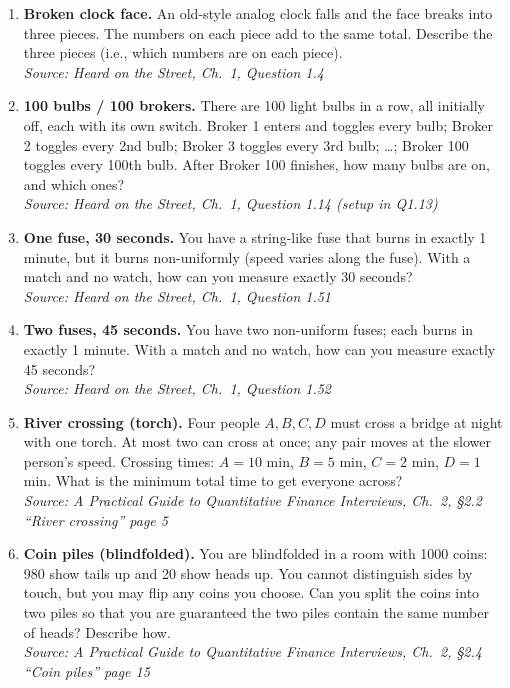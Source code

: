 \documentclass[11pt]{article}
\begin{document}
\begin{enumerate}[label=\textbf{\arabic*.}, resume]

\item \textbf{Broken clock face.} An old-style analog clock falls and the face breaks into three pieces. The numbers on each piece add to the same total. Describe the three pieces (i.e., which numbers are on each piece).\\
\hfill{\small\textit{Source: Heard on the Street, Ch.\ 1, Question 1.4 }}

\item \textbf{100 bulbs / 100 brokers.} There are 100 light bulbs in a row, all initially off, each with its own switch. Broker 1 enters and toggles every bulb; Broker 2 toggles every 2nd bulb; Broker 3 toggles every 3rd bulb; \dots; Broker 100 toggles every 100th bulb. After Broker 100 finishes, how many bulbs are on, and which ones?\\
\hfill{\small\textit{Source: Heard on the Street, Ch.\ 1, Question 1.14 (setup in Q1.13) }}

\item \textbf{One fuse, 30 seconds.} You have a string-like fuse that burns in exactly 1 minute, but it burns non-uniformly (speed varies along the fuse). With a match and no watch, how can you measure exactly 30 seconds?\\
\hfill{\small\textit{Source: Heard on the Street, Ch.\ 1, Question 1.51 }}

\item \textbf{Two fuses, 45 seconds.} You have two non-uniform fuses; each burns in exactly 1 minute. With a match and no watch, how can you measure exactly 45 seconds?\\
\hfill{\small\textit{Source: Heard on the Street, Ch.\ 1, Question 1.52 }}

\item \textbf{River crossing (torch).} Four people $A,B,C,D$ must cross a bridge at night with one torch. At most two can cross at once; any pair moves at the slower person’s speed. Crossing times: $A=10$ min, $B=5$ min, $C=2$ min, $D=1$ min. What is the minimum total time to get everyone across?\\
\hfill{\small\textit{Source: A Practical Guide to Quantitative Finance Interviews, Ch.\ 2, \S2.2 ``River crossing'' page 5}}

\item \textbf{Coin piles (blindfolded).} You are blindfolded in a room with 1000 coins: 980 show tails up and 20 show heads up. You cannot distinguish sides by touch, but you may flip any coins you choose. Can you split the coins into two piles so that you are guaranteed the two piles contain the same number of heads? Describe how.\\
\hfill{\small\textit{Source: A Practical Guide to Quantitative Finance Interviews, Ch.\ 2, \S2.4 ``Coin piles'' page 15 }}


\end{enumerate}
\end{document}
